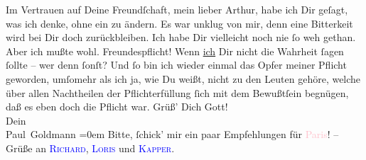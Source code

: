            \pstart
           Im Vertrauen auf Deine Freundſchaft, mein lieber Arthur, habe ich Dir geſagt, was ich
               denke, ohne ein \label{K_L02674-4v}\label{K_L02674-4h} zu ändern. Es war unklug von mir, denn eine
               Bitterkeit wird bei Dir doch zurückbleiben. Ich habe Dir vielleicht noch nie ſo weh
               gethan. Aber ich mußte wohl. Freundespflicht! Wenn \uline{ich} Dir nicht die Wahrheit ſagen ſollte – wer  denn ſonſt? Und ſo bin ich wieder einmal das Opfer meiner Pflicht geworden,
               umſomehr als ich ja, wie Du weißt, nicht zu den Leuten gehöre, welche über allen
               Nachtheilen der Pflichterfüllung ſich mit dem Bewußtſein begnügen, daß es eben doch
               die Pflicht war.\pend
           \pstart
           Grüß’ Dich Gott!{\\[\baselineskip]}Dein{\\[\baselineskip]}\spacefill\mbox{Paul Goldmann}\pend
           \leftskip=0em{}\pstart
           \noindent{}Bitte, ſchick’ mir ein paar Empfehlungen für \textcolor{pink}{Paris}{}\ledrightnote{\textcolor{pink}{Paris}}! – Grüße an \textsc{\textcolor{blue}{Richard}{}\ledrightnote{\textcolor{blue}{Richard Beer-Hofmann}}}, \textsc{\textcolor{blue}{Loris}{}\ledrightnote{\textcolor{blue}{Hugo von Hofmannsthal}}} und \textsc{\textcolor{blue}{Kapper}{}\ledrightnote{\textcolor{blue}{Friedrich Kapper}}}.\pend
           \endnumbering{}\begin{anhang}\end{anhang}
      